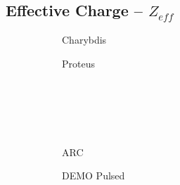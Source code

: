 \clearpage

\newpage

\subsection*{ Effective Charge -- $Z_{eff}$ }
  \label{subsection:sensitivity_Z_eff}

\begin{figure*}[h!]
    \centering
    \hfill
    \begin{subfigure}[t]{0.45\textwidth}
        \centering
    \begin{adjustbox}{width=\textwidth}
      \Large
      
    \end{adjustbox}
        \caption{Charybdis}
    \end{subfigure}
    \hfill
    \begin{subfigure}[t]{0.45\textwidth}
        \centering
    \begin{adjustbox}{width=\textwidth}
      \Large
      
    \end{adjustbox}
        \caption{Proteus}
    \end{subfigure}
    \hfill \hfill ~\\ ~\\ ~\\ ~\\
    \hfill
    \begin{subfigure}[t]{0.45\textwidth}
        \centering
    \begin{adjustbox}{width=\textwidth}
      \Large
      
    \end{adjustbox}
        \caption{ARC}
    \end{subfigure}
    \hfill
    \begin{subfigure}[t]{0.45\textwidth}
        \centering
    \begin{adjustbox}{width=\textwidth}
      \Large
      
    \end{adjustbox}
        \caption{DEMO Pulsed}
    \end{subfigure}
    \hfill \hfill ~\\ ~\\ ~\\ ~\\
    \hfill
    \begin{subfigure}[t]{0.45\textwidth}
        \centering
    \begin{adjustbox}{width=\textwidth}

\end{adjustbox}
\end{subfigure}
\end{figure*}
